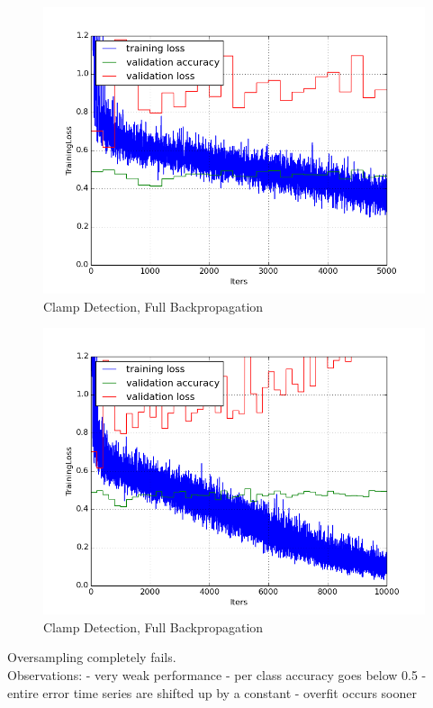 \documentclass[a4paper,11pt]{article}
\begin{document}
\begin{figure}[h!]
	\centering
	\includegraphics[scale=0.5]{images/plot_clampdet_os_none_reinit-5000.png}
	\caption{Clamp Detection, Full Backpropagation}
\end{figure}

\begin{figure}[h!]
	\centering
	\includegraphics[scale=0.5]{images/plot_clampdet_os_none_reinit.png}
	\caption{Clamp Detection, Full Backpropagation}
\end{figure}

Oversampling completely fails. \\

Observations:
- very weak performance
- per class accuracy goes below 0.5
- entire error time series are shifted up by a constant
- overfit occurs sooner
\end{document}

